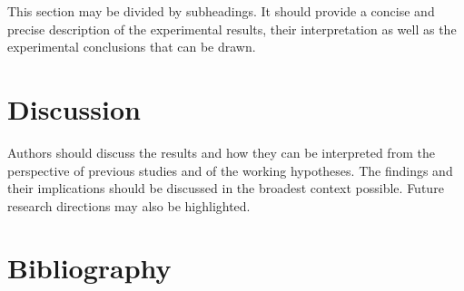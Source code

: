 \documentclass[version=preprint]{iacrcc}
\begin{document}
This section may be divided by subheadings. It should provide a concise and precise description of the experimental results, their interpretation as well as the experimental conclusions that can be drawn.


\section{Discussion}

Authors should discuss the results and how they can be interpreted from the perspective of previous studies and of the working hypotheses. The findings and their implications should be discussed in the broadest context possible. Future research directions may also be highlighted.

\section{Bibliography}

\end{document}
